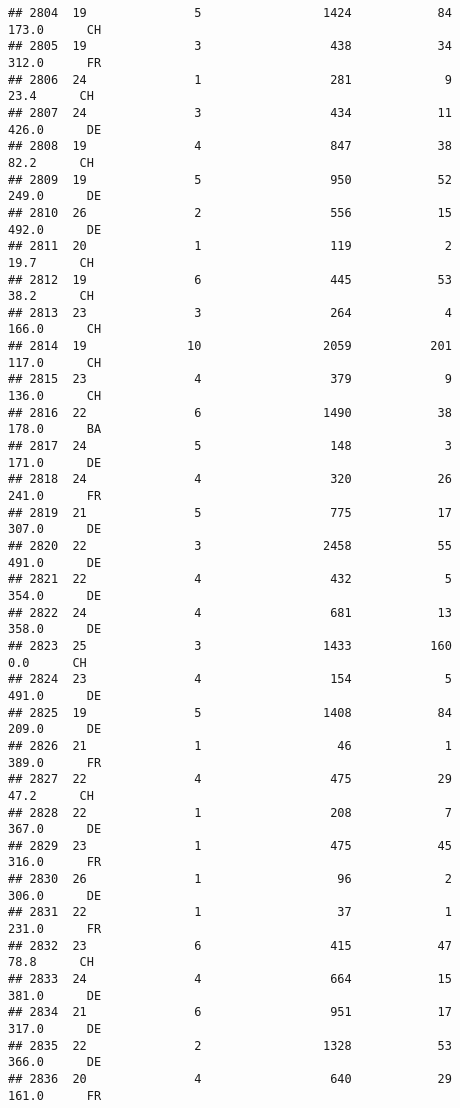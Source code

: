 \documentclass[
]{article}
\begin{document}
\begin{verbatim}
## 2804  19               5                 1424            84    173.0      CH
## 2805  19               3                  438            34    312.0      FR
## 2806  24               1                  281             9     23.4      CH
## 2807  24               3                  434            11    426.0      DE
## 2808  19               4                  847            38     82.2      CH
## 2809  19               5                  950            52    249.0      DE
## 2810  26               2                  556            15    492.0      DE
## 2811  20               1                  119             2     19.7      CH
## 2812  19               6                  445            53     38.2      CH
## 2813  23               3                  264             4    166.0      CH
## 2814  19              10                 2059           201    117.0      CH
## 2815  23               4                  379             9    136.0      CH
## 2816  22               6                 1490            38    178.0      BA
## 2817  24               5                  148             3    171.0      DE
## 2818  24               4                  320            26    241.0      FR
## 2819  21               5                  775            17    307.0      DE
## 2820  22               3                 2458            55    491.0      DE
## 2821  22               4                  432             5    354.0      DE
## 2822  24               4                  681            13    358.0      DE
## 2823  25               3                 1433           160      0.0      CH
## 2824  23               4                  154             5    491.0      DE
## 2825  19               5                 1408            84    209.0      DE
## 2826  21               1                   46             1    389.0      FR
## 2827  22               4                  475            29     47.2      CH
## 2828  22               1                  208             7    367.0      DE
## 2829  23               1                  475            45    316.0      FR
## 2830  26               1                   96             2    306.0      DE
## 2831  22               1                   37             1    231.0      FR
## 2832  23               6                  415            47     78.8      CH
## 2833  24               4                  664            15    381.0      DE
## 2834  21               6                  951            17    317.0      DE
## 2835  22               2                 1328            53    366.0      DE
## 2836  20               4                  640            29    161.0      FR

\end{verbatim}
\end{document}
